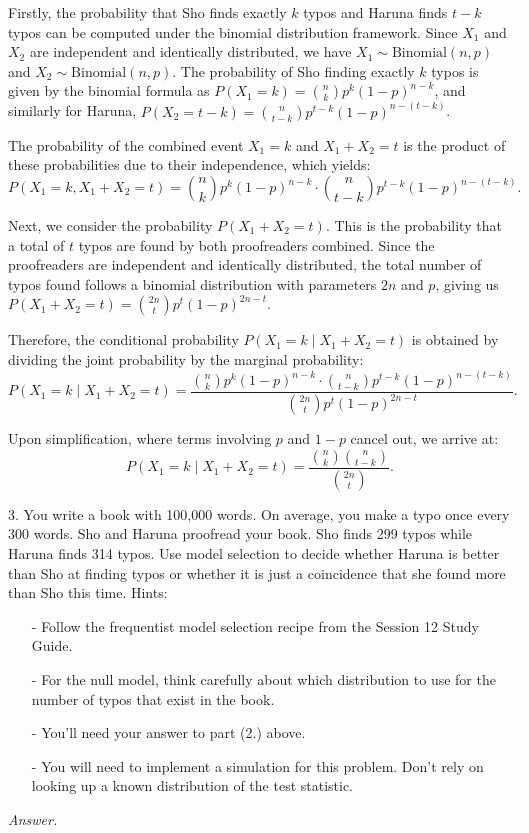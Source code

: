 \documentclass[12pt]{article}
\begin{document}
Firstly, the probability that Sho finds exactly \(k\) typos and Haruna finds \(t-k\) typos can be computed under the binomial distribution framework. Since \(X_1\) and \(X_2\) are independent and identically distributed, we have \(X_1 \sim \text{Binomial}(n, p)\) and \(X_2 \sim \text{Binomial}(n, p)\). The probability of Sho finding exactly \(k\) typos is given by the binomial formula as \(P(X_1=k) = \binom{n}{k} p^k (1-p)^{n-k}\), and similarly for Haruna, \(P(X_2=t-k) = \binom{n}{t-k} p^{t-k} (1-p)^{n-(t-k)}\).

The probability of the combined event \(X_1=k\) and \(X_1+X_2=t\) is the product of these probabilities due to their independence, which yields:
\[
P(X_1=k, X_1+X_2=t) = \binom{n}{k} p^k (1-p)^{n-k} \cdot \binom{n}{t-k} p^{t-k} (1-p)^{n-(t-k)}.
\]

Next, we consider the probability \(P(X_1+X_2=t)\). This is the probability that a total of \(t\) typos are found by both proofreaders combined. Since the proofreaders are independent and identically distributed, the total number of typos found follows a binomial distribution with parameters \(2n\) and \(p\), giving us \(P(X_1+X_2=t) = \binom{2n}{t} p^t (1-p)^{2n-t}\).

Therefore, the conditional probability \(P(X_1=k \mid X_1+X_2=t)\) is obtained by dividing the joint probability by the marginal probability:
\[
P(X_1=k \mid X_1+X_2=t) = \frac{\binom{n}{k} p^k (1-p)^{n-k} \cdot \binom{n}{t-k} p^{t-k} (1-p)^{n-(t-k)}}{\binom{2n}{t} p^t (1-p)^{2n-t}}.
\]

Upon simplification, where terms involving \(p\) and \(1-p\) cancel out, we arrive at:
\[
P(X_1=k \mid X_1+X_2=t) = \frac{\binom{n}{k} \binom{n}{t-k}}{\binom{2n}{t}}.
\]
\newpage
\begin{q}
3. You write a book with 100,000 words. On average, you make a typo once every 300 words. Sho and Haruna proofread your book. Sho finds 299 typos while Haruna finds 314 typos. Use model selection to decide whether Haruna is better than Sho at finding typos or whether it is just a coincidence that she found more than Sho this time.
Hints:
\begin{itemize}
\item[-] Follow the frequentist model selection recipe from the Session 12 Study Guide.
\item[-] For the null model, think carefully about which distribution to use for the number of typos that exist in the book.
\item[-] You'll need your answer to part (2.) above.
\item[-] You will need to implement a simulation for this problem. Don't rely on looking up a known distribution of the test statistic.
\end{itemize}
\end{q}
\textit{Answer.}
\end{document}
